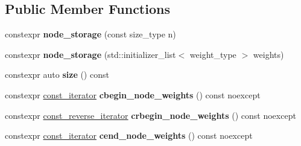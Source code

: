 \subsection*{Public Member Functions}
\begin{DoxyCompactItemize}
\item 
\mbox{\label{classsequoia_1_1maths_1_1graph__impl_1_1node__storage_a08dd8cb40148107cf14b059bc98c9f65}} 
constexpr {\bfseries node\+\_\+storage} (const size\+\_\+type n)
\item 
\mbox{\label{classsequoia_1_1maths_1_1graph__impl_1_1node__storage_a6a5b071385a3e5b8e1717f71f0b926ac}} 
constexpr {\bfseries node\+\_\+storage} (std\+::initializer\+\_\+list$<$ weight\+\_\+type $>$ weights)
\item 
\mbox{\label{classsequoia_1_1maths_1_1graph__impl_1_1node__storage_a59fdf6cf7015a51eaa4e1f8537e67f1a}} 
constexpr auto {\bfseries size} () const
\item 
\mbox{\label{classsequoia_1_1maths_1_1graph__impl_1_1node__storage_aff883b0186a391dfa56298d6258bbaa6}} 
constexpr \mbox{\hyperlink{classsequoia_1_1utilities_1_1iterator}{const\+\_\+iterator}} {\bfseries cbegin\+\_\+node\+\_\+weights} () const noexcept
\item 
\mbox{\label{classsequoia_1_1maths_1_1graph__impl_1_1node__storage_a103489987ffa45f3f79738579f32319e}} 
constexpr \mbox{\hyperlink{classsequoia_1_1utilities_1_1iterator}{const\+\_\+reverse\+\_\+iterator}} {\bfseries crbegin\+\_\+node\+\_\+weights} () const noexcept
\item 
\mbox{\label{classsequoia_1_1maths_1_1graph__impl_1_1node__storage_a841198fc34a8aaf8f9e820377f442347}} 
constexpr \mbox{\hyperlink{classsequoia_1_1utilities_1_1iterator}{const\+\_\+iterator}} {\bfseries cend\+\_\+node\+\_\+weights} () const noexcept
\item 
\mbox{\label{classsequoia_1_1maths_1_1graph__impl_1_1node__storage_abffae6dfe19b790228bf849bb57e72a3}} 

\end{DoxyCompactItemize}
